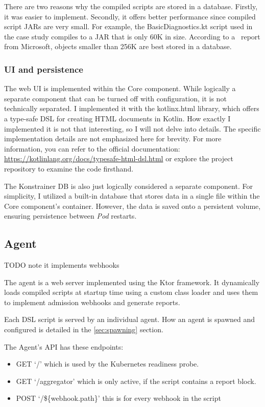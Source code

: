 There are two reasons why the compiled scripts are stored in a database. Firstly, it was easier to implement. Secondly, it offers better performance since compiled script JARs are very small. For example, the BasicDiagnostics.kt script used in the case study compiles to a JAR that is only 60K in size. According to a~\cite{DbSmall} report from Microsoft, objects smaller than 256K are best stored in a database.

\subsubsection{UI and persistence}

The web UI is implemented within the Core component. While logically a separate component that can be turned off with configuration, it is not technically separated. I implemented it with the kotlinx.html library, which offers a type-safe DSL for creating HTML documents in Kotlin. How exactly I implemented it is not that interesting, so I will not delve into details. The specific implementation details are not emphasized here for brevity. For more information, you can refer to the official documentation: \url{https://kotlinlang.org/docs/typesafe-html-dsl.html} or explore the project repository to examine the code firsthand.

The Konstrainer DB is also just logically considered a separate component. For simplicity, I utilized a built-in database that stores data in a single file within the Core component's container. However, the data is saved onto a persistent volume, ensuring persistence between \emph{Pod} restarts.

\subsection{Agent}

TODO note it implements webhooks

The agent is a web server implemented using the Ktor framework. It dynamically loads compiled scripts at startup time using a custom class loader and uses them to implement admission webhooks and generate reports.

Each DSL script is served by an individual agent. How an agent is spawned and configured is detailed in the \ref{sec:spawning} section.

The Agent's API has these endpoints:

\begin{itemize}
    \item GET `/' which is used by the Kubernetes readiness probe.
    \item GET `/aggregator' which is only active, if the script contains a report block.
    \item POST `/\$\{webhook.path\}' this is for every webhook in the script
\end{itemize}

